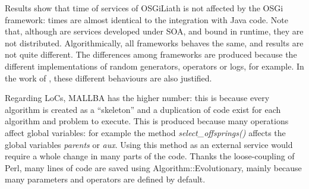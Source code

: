 \begin{table}
\caption{Comparison of tested EA frameworks in time and development.}
\label{tab:times}
\end{table}

Results show that time of services of OSGiLiath is not affected by the OSGi framework: times are almost identical to the integration with Java code. Note that, although are services developed under SOA, and bound in runtime, they are not distributed. Algorithmically, all frameworks behaves the same, and results are not quite different. The differences among frameworks are produced because the different implementations of random generators, operators or logs, for example. In the work of  \cite{PERL}, these different behaviours are also justified.



Regarding LoCs, MALLBA has the higher number: this is because every algorithm is created as a ``skeleton'' and a duplication of code exist for each algorithm and problem to execute. This is produced because many operations affect global variables: for example the method {\em select\_offsprings()} affects the global variables {\em parents} or {\em aux}. Using this method as an external service would require a whole change in many parts of the code. Thanks the loose-coupling of Perl, many lines of code are saved using Algorithm::Evolutionary, mainly because many parameters and operators are defined by default.



